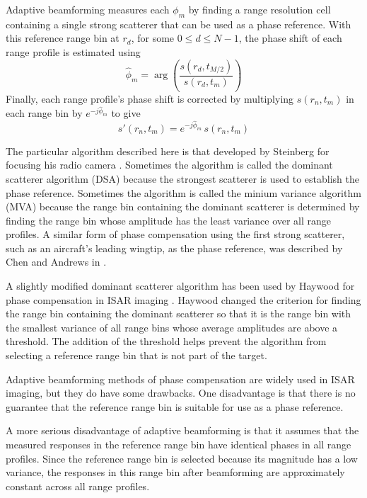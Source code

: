 Adaptive beamforming measures each $\phi_m$ by finding a range
resolution cell containing a single strong scatterer that can be used as a
phase reference.  With this reference range bin at $r_d$, for some $0\leq
d\leq N-1$, the phase shift of each range profile is estimated using
\begin{equation}
\widehat{\phi}_m=\arg\left(\frac{s(r_d,t_{M/2})}{s(r_d,t_m)}\right)
\end{equation}
Finally, each range profile's phase shift is corrected by multiplying
$s(r_n,t_m)$ in each range bin by $e^{-j\widehat{\phi}_m}$ to give
\begin{equation}
s'(r_n,t_m)=e^{-j\widehat{\phi}_m}\,s(r_n,t_m)
\end{equation}

The particular algorithm described here is that developed by
Steinberg \cite{Ste81,Ste83b} for focusing his radio camera \cite{Ste83}.
Sometimes the algorithm is called the dominant scatterer algorithm (DSA)
because the strongest scatterer is used to establish the phase reference.
Sometimes the algorithm is called the minium variance algorithm (MVA)
because the range bin containing the dominant scatterer is determined by
finding the range bin whose amplitude has the least variance over all range
profiles.  A similar form of phase compensation using the first strong
scatterer, such as an aircraft's leading wingtip, as the phase reference,
was described by Chen and Andrews in \cite{Che80a}.  

A slightly modified dominant scatterer algorithm has been used by Haywood
for phase compensation in ISAR imaging \cite{Hay89,Hay92a}.  Haywood
changed the criterion for finding the range bin containing the
dominant scatterer so that it is the range bin with the smallest
variance of all range bins whose average amplitudes are above a threshold.  The
addition of the threshold helps prevent the algorithm from selecting a
reference range bin that is not part of the target.

Adaptive beamforming methods of phase compensation are widely used in ISAR
imaging, but they do have some drawbacks.  One disadvantage is that there is
no guarantee that the reference range bin is suitable for use as a phase
reference.

A more serious disadvantage of adaptive beamforming is that it assumes that
the measured responses in the reference range bin have identical phases in
all range profiles.  Since the reference range bin is selected because its
magnitude has a low variance, the responses in this range bin after
beamforming are approximately constant across all range profiles.

